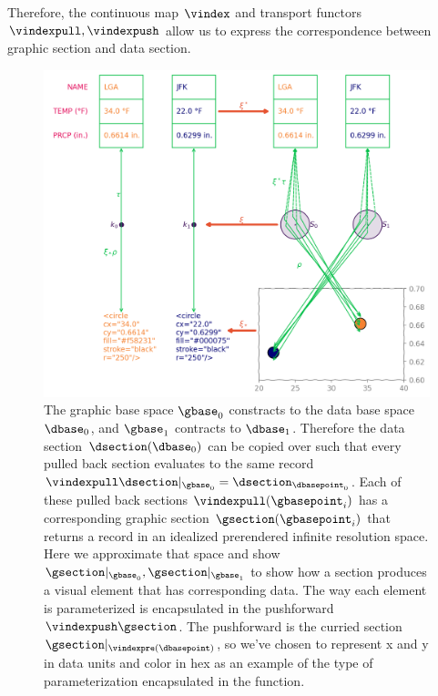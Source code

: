 \documentclass[10pt,journal,compsoc]{IEEEtran}
\theoremstyle{definition}
\theoremstyle{remark}
\begin{document}
Therefore, the continuous map $\vindex$ and transport functors $\vindexpull, \vindexpush$ allow us to express the correspondence between graphic section and data section. 

\begin{figure}[h!]
  \includegraphics*[width=1\columnwidth]{xi_scatter.png}
  \caption{The graphic base space $\gbase_{0}$ constracts to the data base space $\dbase_{0}$, and $\gbase_{1}$ contracts to $\dbase_{1}$. Therefore the data section $\dsection(\dbase_{0})$ can be copied over such that every pulled back section evaluates to the same record $\vindexpull\dsection|_{\gbase_{0}} = \dsection_{\dbasepoint_{0}}$. Each of these pulled back sections $\vindexpull(\gbasepoint_i)$ has a corresponding graphic section $\gsection(\gbasepoint_i)$ that returns a record in an idealized prerendered infinite resolution space. Here we approximate that space and show $\gsection|_{\gbase_0}, \gsection|_{\gbase_1}$ to show how a section produces a visual element that has corresponding data. The way each element is parameterized is encapsulated in the pushforward $\vindexpush\gsection$. The pushforward is the curried section $\gsection|_{\vindexpre(\dbasepoint)}$, so we've chosen to represent x and y in data units and color in hex as an example of the type of parameterization encapsulated in the function. \label{fig:atct:morphisms:sheaf}}
\end{figure}
\end{document}
